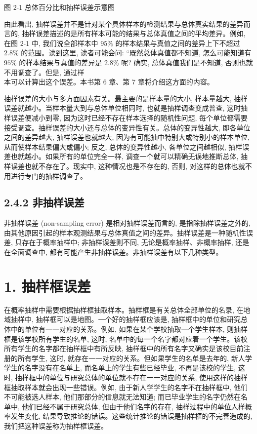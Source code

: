 \documentclass[10pt]{article}
\begin{document}
\begin{CJK*}{UTF8}{bsmi}
\begin{center}
\end{center}

图 2-1 总体百分比和抽样误差示意图

由此看出, 抽样误差并不是针对某个具体样本的检测结果与总体真实结果的差异而言的, 抽样误差描述的是所有样本可能的结果与总体真值之间的平均差异。例如, 在图 2-1 中, 我们说全部样本中 $95 \%$ 的样本结果与真值之间的差异上下不超过 $2.8 \%$ 的范围。读到这里, 读者可能会问: “既然总体真值都不知道, 怎么可能知道有 $95 \%$ 的样本结果与真值的差异是 $2.8 \%$ 呢? 确实, 总体真值我们是不知道, 否则也就不用调查了。但是, 通过样\\
本可以计算出这个误差。本书第 6 章、第 7 章将介绍这方面的内容。

抽样误差的大小与多方面因素有关。最主要的是样本量的大小, 样本量越大, 抽样误差就越小。当样本量大到与总体单位相同时, 也就是抽样调查变成普查, 这时抽样误差便减小到零, 因为这时已经不存在样本选择的随机性问题, 每个单位都需要接受调查。抽样误差的大小还与总体的变异性有关。总体的变异性越大, 即各单位之间的差异越大, 抽样误差也就越大, 因为有可能抽中特别大或特别小的样本单位, 从而使样本结果偏大或偏小; 反之, 总体的变异性越小, 各单位之间越相似, 抽样误差也就越小。如果所有的单位完全一样, 调查一个就可以精确无误地推断总体, 抽样误差也就不存在了。现实中, 这种情况也是不存在的, 否则, 对这样的总体也就不用进行专门的抽样调查了。

\subsection*{2.4.2 非抽样误差}
非抽样误差 (non-sampling error) 是相对抽样误差而言的, 是指除抽样误差之外的,由其他原因引起的样本观测结果与总体真值之间的差异。抽样误差是一种随机性误差, 只存在于概率抽样中; 非抽样误差则不同, 无论是概率抽样、非概率抽样, 还是在全面调查中, 都有可能产生非抽样误差。非抽样误差有以下几种类型。

\section*{1. 抽样框误差}
在概率抽样中需要根据抽样框抽取样本。抽样框是有关总体全部单位的名录, 在地域抽样中, 抽样框可以是地图。一个好的抽样框应该是, 抽样框中的单位和研究总体中的单位有一一对应的关系。例如, 如果在某个学校抽取一个学生样本, 则抽样框是该学校所有学生的名单, 这时, 名单中的每一个名字都对应着一个学生。该校所有学生的名字都在抽样框中有所反映, 抽样框中的所有名字又确实是该校目前注册的所有学生, 这时, 就存在一一对应的关系。但如果学生的名单是去年的, 新人学学生的名字没有在名单上, 而名单上的学生有些已经毕业, 不再是该校的学生, 这时, 抽样框中的单位与研究总体的单位就不存在一一对应的关系, 使用这样的抽样框抽取样本就会出现一些错误。例如, 由于新人学学生的名字不在抽样框中, 他们不可能被选人样本, 他们那部分的信息就无法知道; 而已毕业学生的名字仍然在名单中, 他们已经不属于研究总体, 但由于他们名字的存在, 抽样过程中的单位人样概率发生变化, 结果导致推论的错误。这些统计推论的错误是抽样框的不完善造成的, 我们把这种误差称为抽样框误差。


\end{CJK*}
\end{document}
